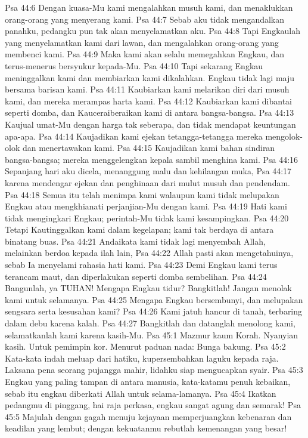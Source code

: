Psa 44:6  Dengan kuasa-Mu kami mengalahkan musuh kami, dan menaklukkan orang-orang yang menyerang kami.
Psa 44:7  Sebab aku tidak mengandalkan panahku, pedangku pun tak akan menyelamatkan aku.
Psa 44:8  Tapi Engkaulah yang menyelamatkan kami dari lawan, dan mengalahkan orang-orang yang membenci kami.
Psa 44:9  Maka kami akan selalu memegahkan Engkau, dan terus-menerus bersyukur kepada-Mu.
Psa 44:10  Tapi sekarang Engkau meninggalkan kami dan membiarkan kami dikalahkan. Engkau tidak lagi maju bersama barisan kami.
Psa 44:11  Kaubiarkan kami melarikan diri dari musuh kami, dan mereka merampas harta kami.
Psa 44:12  Kaubiarkan kami dibantai seperti domba, dan Kauceraiberaikan kami di antara bangsa-bangsa.
Psa 44:13  Kaujual umat-Mu dengan harga tak seberapa, dan tidak mendapat keuntungan apa-apa.
Psa 44:14  Kaujadikan kami ejekan tetangga-tetangga mereka mengolok-olok dan menertawakan kami.
Psa 44:15  Kaujadikan kami bahan sindiran bangsa-bangsa; mereka menggelengkan kepala sambil menghina kami.
Psa 44:16  Sepanjang hari aku dicela, menanggung malu dan kehilangan muka,
Psa 44:17  karena mendengar ejekan dan penghinaan dari mulut musuh dan pendendam.
Psa 44:18  Semua itu telah menimpa kami walaupun kami tidak melupakan Engkau atau mengkhianati perjanjian-Mu dengan kami.
Psa 44:19  Hati kami tidak mengingkari Engkau; perintah-Mu tidak kami kesampingkan.
Psa 44:20  Tetapi Kautinggalkan kami dalam kegelapan; kami tak berdaya di antara binatang buas.
Psa 44:21  Andaikata kami tidak lagi menyembah Allah, melainkan berdoa kepada ilah lain,
Psa 44:22  Allah pasti akan mengetahuinya, sebab Ia menyelami rahasia hati kami.
Psa 44:23  Demi Engkau kami terus terancam maut, dan diperlakukan seperti domba sembelihan.
Psa 44:24  Bangunlah, ya TUHAN! Mengapa Engkau tidur? Bangkitlah! Jangan menolak kami untuk selamanya.
Psa 44:25  Mengapa Engkau bersembunyi, dan melupakan sengsara serta kesusahan kami?
Psa 44:26  Kami jatuh hancur di tanah, terbaring dalam debu karena kalah.
Psa 44:27  Bangkitlah dan datanglah menolong kami, selamatkanlah kami karena kasih-Mu.
Psa 45:1  Mazmur kaum Korah. Nyanyian kasih. Untuk pemimpin kor. Menurut paduan nada: Bunga bakung.
Psa 45:2  Kata-kata indah meluap dari hatiku, kupersembahkan laguku kepada raja. Laksana pena seorang pujangga mahir, lidahku siap mengucapkan syair.
Psa 45:3  Engkau yang paling tampan di antara manusia, kata-katamu penuh kebaikan, sebab itu engkau diberkati Allah untuk selama-lamanya.
Psa 45:4  Ikatkan pedangmu di pinggang, hai raja perkasa, engkau sangat agung dan semarak!
Psa 45:5  Majulah dengan gagah menuju kejayaan memperjuangkan kebenaran dan keadilan yang lembut; dengan kekuatanmu rebutlah kemenangan yang besar!
